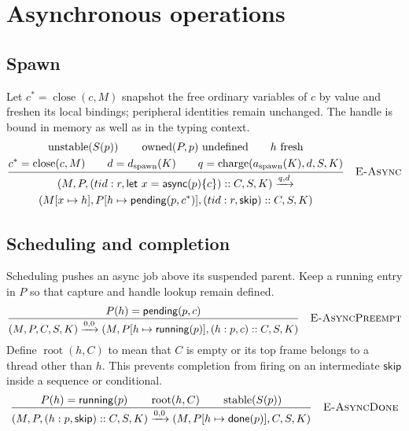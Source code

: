 \documentclass[11pt]{article}
\newcommand{\kw}[1]{\mathsf{#1}}
\newcommand{\step}[2]{\xrightarrow{#1,#2}}
\newcommand{\rulelabel}[1]{\quad\textsc{#1}}
\newcommand{\charge}{\operatorname{charge}}
\newcommand{\stable}{\operatorname{stable}}
\newcommand{\unstable}{\operatorname{unstable}}
\newcommand{\frm}[3]{(#1:#2,#3)}
\begin{document}
\section{Asynchronous operations}
\subsection{Spawn}
Let $c^*=\operatorname{close}(c,M)$ snapshot the free ordinary variables of
$c$ by value and freshen its local bindings; peripheral identities remain
unchanged. The handle is bound in memory as well as in the typing context.
\[
\frac{
 \begin{gathered}
 \unstable(S(p))\qquad\operatorname{owned}(P,p)\text{ undefined}
 \qquad h\text{ fresh}\\
 c^*=\operatorname{close}(c,M)\qquad d=d_{\mathrm{spawn}}(K)
 \qquad q=\charge(a_{\mathrm{spawn}}(K),d,S,K)
 \end{gathered}
}{
 \begin{gathered}
 (M,P,\frm{tid}{r}{\kw{let}\ x=\kw{async}(p)\{c\}}::C,S,K)
 \step{q}{d}\\
 (M[x\mapsto h],P[h\mapsto\kw{pending}(p,c^*)],
       \frm{tid}{r}{\kw{skip}}::C,S,K)
 \end{gathered}
}\rulelabel{E-Async}
\]

\subsection{Scheduling and completion}
Scheduling pushes an async job above its suspended parent. Keep a running
entry in $P$ so that capture and handle lookup remain defined.
\[
\frac{P(h)=\kw{pending}(p,c)}{
 (M,P,C,S,K)\step{0}{0}
 (M,P[h\mapsto\kw{running}(p)],\frm{h}{p}{c}::C,S,K)
}\rulelabel{E-AsyncPreempt}
\]
Define $\operatorname{root}(h,C)$ to mean that $C$ is empty or its top frame
belongs to a thread other than $h$. This prevents completion from firing on
an intermediate $\kw{skip}$ inside a sequence or conditional.
\[
\frac{
 P(h)=\kw{running}(p)\qquad\operatorname{root}(h,C)
 \qquad\stable(S(p))
}{
 (M,P,\frm{h}{p}{\kw{skip}}::C,S,K)
 \step{0}{0}
 (M,P[h\mapsto\kw{done}(p)],C,S,K)
}\rulelabel{E-AsyncDone}
\]
\end{document}
